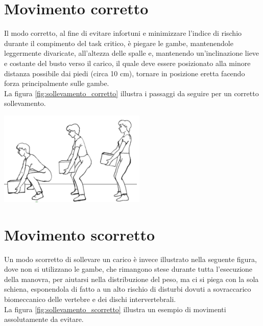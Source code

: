\documentclass[a4paper, oneside]{book}
\begin{document}
	\section{Movimento corretto}
Il modo corretto, al fine di evitare infortuni e minimizzare l'indice di rischio durante il compimento del task critico, è piegare le gambe, mantenendole leggermente divaricate, all'altezza delle spalle e, mantenendo un’inclinazione lieve e costante del busto verso il carico, il quale deve essere posizionato alla minore distanza possibile dai piedi (circa 10 cm), tornare in posizione eretta facendo forza principalmente sulle gambe. \\ La figura \ref{fig:sollevamento_corretto} illustra i passaggi da seguire per un corretto sollevamento.\\

\vspace{2mm}
\begin{center}
\begin{minipage}{0.48\linewidth}
\begin{center}
\includegraphics[width=70mm,scale=0.7]{./images/sollevamento_corretto.png} 
\vspace{3mm}
\label{fig:sollevamento_corretto}
\end{center}
\end{minipage}
\end{center}
\vspace{5mm}

\section{Movimento scorretto}
	Un modo scorretto di sollevare un carico è invece illustrato nella seguente figura, dove non si utilizzano le gambe, che rimangono stese durante tutta l'esecuzione della manovra, per aiutarsi nella distribuzione del peso, ma ci si piega con la sola schiena, esponendola di fatto a un alto rischio di disturbi dovuti a sovraccarico biomeccanico delle vertebre e dei dischi intervertebrali. \\ La figura \ref{fig:sollevamento_scorretto} illustra un esempio di movimenti assolutamente da evitare.\\
\end{document}
